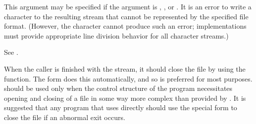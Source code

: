 \begin{defun}[Function]
\begin{newer}
\begin{flushdesc}
This argument may be specified if the  argument is
, , or .  It is an error to write a character
to the resulting stream that cannot be represented by the specified file format.
(However, the  character cannot produce such an error;
implementations must provide appropriate line division behavior for all character
streams.)

See .
\end{flushdesc}
\end{newer}

When the caller is finished with the stream, it should close the file by
using the  function.  The 
form does this automatically, and so is preferred for most purposes.
 should be used only when the control structure of the program
necessitates opening and closing of a file in some way more complex than
provided by .  It is suggested that any program that uses
 directly should use the special form  to
close the file if an abnormal exit occurs.
\end{defun}

